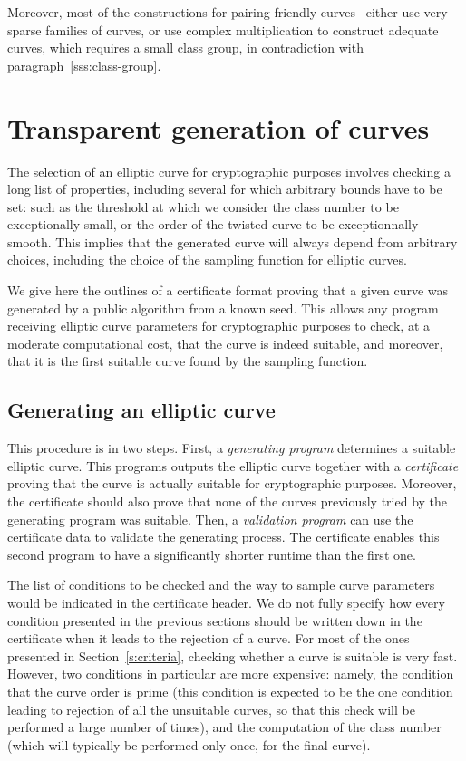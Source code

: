 \documentclass[twocolumn,letterpaper]{article}
\begin{document}
Moreover, most of the constructions
for pairing-friendly curves~\cite{jc2010fst,space2014em}
either use very sparse families of curves,
or use complex multiplication to construct adequate curves,
which requires a small class group,
in contradiction with paragraph~\ref{sss:class-group}.

\section{Transparent generation of curves}
\label{s:certif}

The selection of an elliptic curve for cryptographic purposes
involves checking a long list of properties,
including several for which arbitrary bounds have to be set:
such as the threshold at which we consider the class number
to be exceptionally small,
or the order of the twisted curve to be exceptionnally smooth.
This implies that the generated curve
will always depend from arbitrary choices,
including the choice of the sampling function for elliptic curves.

We give here the outlines of a certificate format
proving that a given curve was generated by a public algorithm
from a known seed.
This allows any program receiving elliptic curve parameters
for cryptographic purposes
to check, at a moderate computational cost,
that the curve is indeed suitable,
and moreover, that it is the first suitable curve
found by the sampling function.

\subsection{Generating an elliptic curve}

This procedure is in two steps.
First, a \emph{generating program} determines a suitable elliptic curve.
This programs outputs the elliptic curve
together with a \emph{certificate} proving that
the curve is actually suitable for cryptographic purposes.
Moreover, the certificate should also prove that
none of the curves previously tried by the generating program
was suitable.
Then, a \emph{validation program} can use the certificate data
to validate the generating process.
The certificate enables this second program
to have a significantly shorter runtime than the first one.

The list of conditions to be checked and the way to sample
curve parameters would be indicated in the certificate header.
We do not fully specify how every condition presented
in the previous sections should be written down in the
certificate when it leads to the rejection of a curve.
For most of the ones presented in Section~\ref{s:criteria},
checking whether a curve is suitable is very fast.
However, two conditions in particular are more expensive:
namely, the condition that the curve order is prime
(this condition is expected to be the one condition
leading to rejection of all the unsuitable curves,
so that this check will be performed a large number of times),
and the computation of the class number
(which will typically be performed only once, for the final curve).
\end{document}
